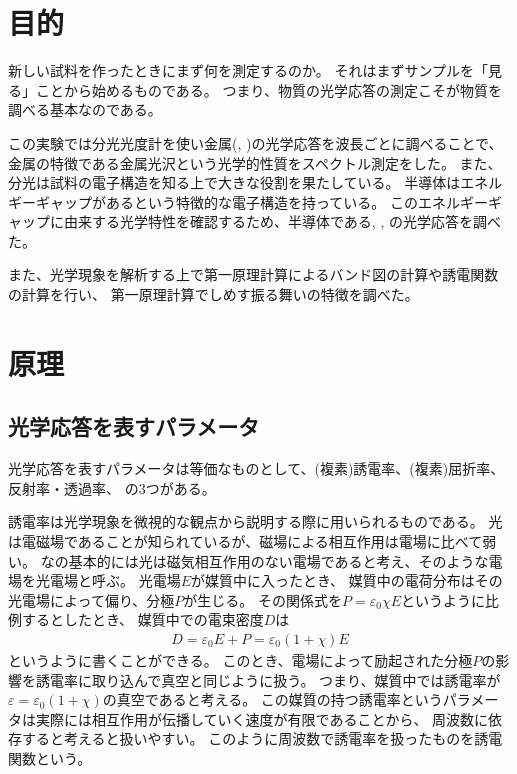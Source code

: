 \documentclass[11pt,dvipdfmx,a4paper]{jsarticle}
\begin{document}
\section{目的}
新しい試料を作ったときにまず何を測定するのか。
それはまずサンプルを「見る」ことから始めるものである。
つまり、物質の光学応答の測定こそが物質を調べる基本なのである。

この実験では分光光度計を使い金属(, )の光学応答を波長ごとに調べることで、
金属の特徴である金属光沢という光学的性質をスペクトル測定をした。
また、分光は試料の電子構造を知る上で大きな役割を果たしている。
半導体はエネルギーギャップがあるという特徴的な電子構造を持っている。
このエネルギーギャップに由来する光学特性を確認するため、半導体である, , の光学応答を調べた。

また、光学現象を解析する上で第一原理計算によるバンド図の計算や誘電関数の計算を行い、
第一原理計算でしめす振る舞いの特徴を調べた。

\section{原理}
\subsection*{光学応答を表すパラメータ}
光学応答を表すパラメータは等価なものとして、(複素)誘電率、(複素)屈折率、反射率・透過率、
の3つがある。

誘電率は光学現象を微視的な観点から説明する際に用いられるものである。
光は電磁場であることが知られているが、磁場による相互作用は電場に比べて弱い。
なの基本的には光は磁気相互作用のない電場であると考え、そのような電場を光電場と呼ぶ。
光電場\(E\)が媒質中に入ったとき、
媒質中の電荷分布はその光電場によって偏り、分極\(P\)が生じる。
その関係式を\(P = \varepsilon_0\chi E\)というように比例するとしたとき、
媒質中での電束密度\(D\)は
\begin{align}
    D = \varepsilon_0 E + P = \varepsilon_0(1+\chi)E
\end{align}
というように書くことができる。
このとき、電場によって励起された分極\(P\)の影響を誘電率に取り込んで真空と同じように扱う。
つまり、媒質中では誘電率が\(\varepsilon=\varepsilon_0 (1+\chi)\)の真空であると考える。
この媒質の持つ誘電率というパラメータは実際には相互作用が伝播していく速度が有限であることから、
周波数に依存すると考えると扱いやすい。
このように周波数で誘電率を扱ったものを誘電関数という。
\end{document}

